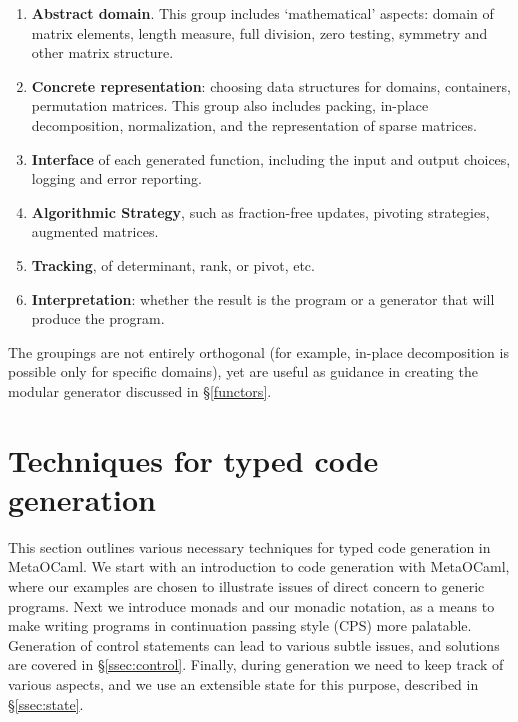 \documentclass{elsart}
\newcommand{\oleg}[1]{{\it [Oleg says: #1]}}
\newcommand{\jacques}[1]{{\it [Jacques says: #1]}}
\begin{document}
\begin{enumerate}
    \item \textbf{Abstract domain}.  This group includes
      `mathematical' aspects: domain of matrix elements, length
      measure, full division, zero testing,
      symmetry and other matrix structure.
    \item \textbf{Concrete representation}: choosing data
      structures for domains, containers, permutation
      matrices. This group also includes packing, in-place
      decomposition, normalization, and the
      representation of sparse matrices.
    \item \textbf{Interface} of each generated function, including
      the input and output choices, logging and error reporting.
    \item \textbf{Algorithmic Strategy}, such as fraction-free
      updates, pivoting strategies, augmented matrices.
    \item \textbf{Tracking}, of determinant, rank, or pivot, etc.
    \item \textbf{Interpretation}: whether the result is the program or a
      generator that will produce the program.
\end{enumerate}


The groupings are not entirely orthogonal (for example, in-place
decomposition is possible only for specific domains), yet are useful
as guidance in creating the modular generator discussed in 
\S\ref{functors}.

\section{Techniques for typed code generation}\label{CPS}

This section  outlines various necessary techniques for typed code
generation in MetaOCaml.  We start with an introduction to code generation
with MetaOCaml, where our examples are chosen to illustrate issues of
direct concern to generic programs.  Next we introduce monads and our
monadic notation, as a means to make writing programs in continuation
passing style (CPS) more palatable.  Generation of control statements can
lead to various subtle issues, and solutions are covered in 
\S\ref{ssec:control}.  Finally, during generation we need to keep track of
various aspects, and we use an extensible state for this purpose, described
in \S\ref{ssec:state}.
\end{document}
